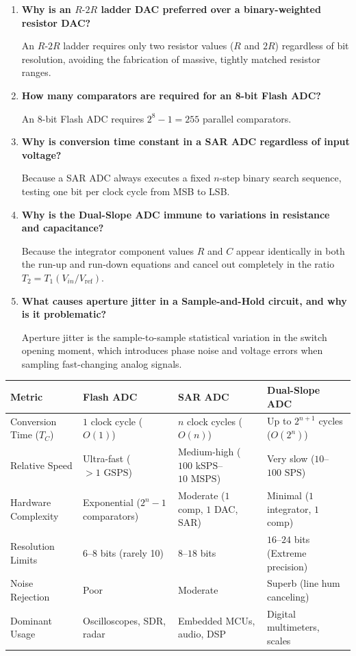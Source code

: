 \documentclass[12pt,a4paper]{article}
\newcommand{\Q}[1]{\textbf{#1}\par\noindent\ignorespaces}
\begin{document}
\begin{tcolorbox}[exambox, title={\textbf{Frequently Asked / Viva Questions}}]
\begin{enumerate}[topsep=0pt, label=\textbf{Q\arabic*.}, itemsep=5pt]
  \item \Q{Why is an $R\text{-}2R$ ladder DAC preferred over a binary-weighted resistor DAC?}
  An $R\text{-}2R$ ladder requires only two resistor values ($R$ and $2R$) regardless of bit resolution, avoiding the fabrication of massive, tightly matched resistor ranges.

  \item \Q{How many comparators are required for an 8-bit Flash ADC?}
  An 8-bit Flash ADC requires $2^8 - 1 = 255$ parallel comparators.

  \item \Q{Why is conversion time constant in a SAR ADC regardless of input voltage?}
  Because a SAR ADC always executes a fixed $n$-step binary search sequence, testing one bit per clock cycle from MSB to LSB.

  \item \Q{Why is the Dual-Slope ADC immune to variations in resistance and capacitance?}
  Because the integrator component values $R$ and $C$ appear identically in both the run-up and run-down equations and cancel out completely in the ratio $T_2 = T_1 (V_{in}/V_{\text{ref}})$.

  \item \Q{What causes aperture jitter in a Sample-and-Hold circuit, and why is it problematic?}
  Aperture jitter is the sample-to-sample statistical variation in the switch opening moment, which introduces phase noise and voltage errors when sampling fast-changing analog signals.
\end{enumerate}
\end{tcolorbox}

\begin{tcolorbox}[tikzbox, title={\textbf{Summary Matrix: Comparison of ADC Architectures}}]
\centering
\begingroup
\setlength{\tabcolsep}{4pt}
\setlength{\extrarowheight}{3pt}
\begin{tabularx}{\linewidth}{|B{3.2cm}|Y|Y|Y|}
\hline
\textbf{Metric} & \textbf{Flash ADC} & \textbf{SAR ADC} & \textbf{Dual-Slope ADC} \\
\hline
Conversion Time ($T_C$) & $1$ clock cycle ($O(1)$) & $n$ clock cycles ($O(n)$) & Up to $2^{n+1}$ cycles ($O(2^n)$) \\
\hline
Relative Speed & Ultra-fast ($> 1\text{ GSPS}$) & Medium-high ($100\text{ kSPS}$--$10\text{ MSPS}$) & Very slow ($10$--$100\text{ SPS}$) \\
\hline
Hardware Complexity & Exponential ($2^n - 1$ comparators) & Moderate ($1$ comp, $1$ DAC, SAR) & Minimal ($1$ integrator, $1$ comp) \\
\hline
Resolution Limits & $6\text{--}8$ bits (rarely 10) & $8\text{--}18$ bits & $16\text{--}24$ bits (Extreme precision) \\
\hline
Noise Rejection & Poor & Moderate & Superb (line hum canceling) \\
\hline
Dominant Usage & Oscilloscopes, SDR, radar & Embedded MCUs, audio, DSP & Digital multimeters, scales \\
\hline
\end{tabularx}
\endgroup
\end{tcolorbox}
\end{document}
